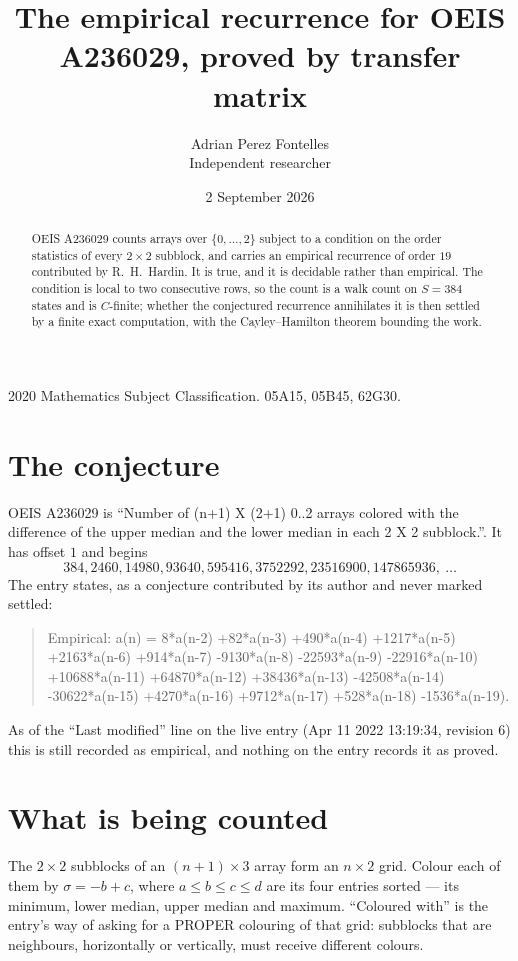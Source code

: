 \documentclass[11pt,a4paper]{article}
\title{The empirical recurrence for OEIS A236029, proved by transfer matrix}
\author{Adrian Perez Fontelles\\ \small Independent researcher}
\date{2 September 2026}
\theoremstyle{plain}
\theoremstyle{definition}
\begin{document}
\maketitle

\begin{abstract}
OEIS A236029 counts arrays over $\{0,\dots,2\}$ subject to a condition on the order
statistics of every $2\times2$ subblock, and carries an empirical recurrence of order
$19$ contributed by R.~H.~Hardin. It is true, and it is decidable rather than empirical.
The condition is local to two consecutive rows, so the count is a walk count on $S=384$
states and is $C$-finite; whether the conjectured recurrence annihilates it is then settled by
a finite exact computation, with the Cayley--Hamilton theorem bounding the work.
\end{abstract}

\noindent\small 2020 Mathematics Subject Classification. 05A15, 05B45, 62G30.\normalsize

\section{The conjecture}

OEIS A236029 is ``Number of (n+1) X (2+1) 0..2 arrays colored with the difference of the upper median and the lower median in each 2 X 2 subblock.''. It has offset $1$ and begins
\[
384, 2460, 14980, 93640, 595416, 3752292, 23516900, 147865936,\ \dots
\]
The entry states, as a conjecture contributed by its author and never marked settled:
\begin{quote}
Empirical: a(n) = 8*a(n-2) +82*a(n-3) +490*a(n-4) +1217*a(n-5) +2163*a(n-6) +914*a(n-7) -9130*a(n-8) -22593*a(n-9) -22916*a(n-10) +10688*a(n-11) +64870*a(n-12) +38436*a(n-13) -42508*a(n-14) -30622*a(n-15) +4270*a(n-16) +9712*a(n-17) +528*a(n-18) -1536*a(n-19).
\end{quote}
As of the ``Last modified'' line on the live entry (Apr 11 2022 13:19:34, revision 6) this is still
recorded as empirical, and nothing on the entry records it as proved.

\section{What is being counted}

The $2\times2$ subblocks of an $(n+1)\times3$ array form an
$n\times2$ grid. Colour each of them by $\sigma=-b+c$, where $a\le b\le c\le d$ are its four entries sorted --- its minimum, lower median, upper median and maximum. ``Coloured with'' is the entry's way of
asking for a PROPER colouring of that grid: subblocks that are neighbours, horizontally or
vertically, must receive different colours.
\end{document}
